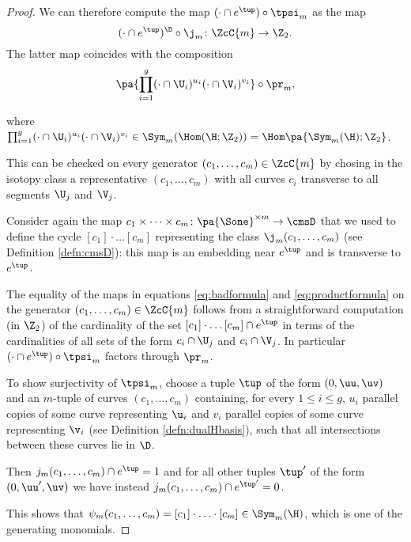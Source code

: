\begin{proof}
We can therefore compute the map $(\cdot\cap e^{\tup})\circ\tpsi_m$ as the map 
\begin{equation}
\label{eq:badformula}
(\cdot\cap e^{\tup})^{\D}\circ\j_m\colon \ZcC{m}\to\Z_2.
\end{equation}
The latter map coincides with the composition
\begin{equation}
 \label{eq:productformula}
\pa{ \prod_{i=1}^g(\cdot\cap\U_i)^{u_i}(\cdot\cap\V_i)^{v_i}}\circ\pr_m,
\end{equation}

where $\prod_{i=1}^g(\cdot\cap\U_i)^{u_i}(\cdot\cap\V_i)^{v_i}\in\Sym_m(\Hom(\H;\Z_2))=\Hom\pa{\Sym_m(\H);\Z_2}$.

This can be checked on every generator $(c_1,\dots, c_m)\in\ZcC{m}$ by chosing in the isotopy class a representative $(c_1,\dots, c_m)$
with all curves $c_i$ transverse to all segments $\U_j$ and $\V_j$.

Consider again the map $c_1\times\dots\times c_m\colon \pa{\Sone}^{\times m}\to\cmsD$ that we used to define the cycle $[c_1]\cdot\dots[c_m]$
representing the class $\j_m(c_1,\dots,c_m)$ (see Definition \ref{defn:cmsD}):
this map is an embedding near $e^{\tup}$ and is transverse to $e^{\tup}$.

The equality of the maps in equations \eqref{eq:badformula} and \eqref{eq:productformula} on the generator $(c_1,\dots,c_m)\in\ZcC{m}$
follows from a straightforward
computation (in $\Z_2$) of the cardinality of the set $[c_1]\cdot\dots[c_m]\cap e^{\tup}$ in terms
of the cardinalities of all sets of the form $c_i\cap\U_j$ and $c_i\cap \V_j$.
In particular $(\cdot\cap e^{\tup})\circ\tpsi_m$ factors through $\pr_m$.

To show surjectivity of $\tpsi_m$, choose a tuple $\tup$ of the form $(0,\uu,\uv)$
and an $m$-tuple of curves $(c_1,\dots,c_m)$ containing, for every $1\leq i\leq g$, $u_i$ parallel
copies of some curve representing $\u_i$ and $v_i$ parallel copies of some curve representing
$\v_i$ (see Definition \ref{defn:dualHbasis}), such that all intersections between these curves
lie in $\D$.

Then $j_m(c_1,\dots,c_m)\cap e^{\tup}=1$ and for all
other tuples $\tup'$ of the form $(0,\uu',\uv)$ we have instead $j_m(c_1,\dots,c_m)\cap e^{\tup'}=0$.

This shows that $\psi_m(c_1,\dots,c_m)=[c_1]\cdot\ldots\cdot[c_m]\in\Sym_m(\H)$, which is
one of the generating monomials.
\end{proof}


